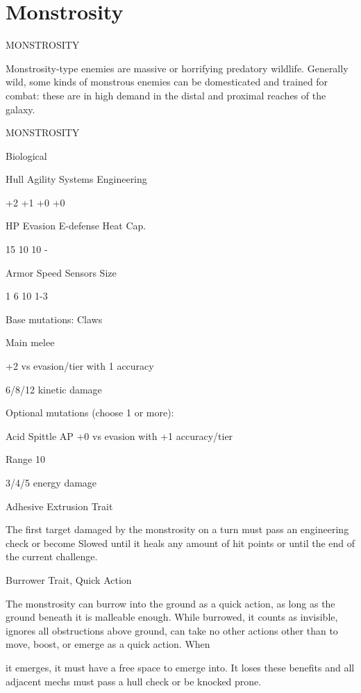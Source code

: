 \section{Monstrosity}
                                           MONSTROSITY

Monstrosity-type enemies are massive or horrifying predatory wildlife. Generally wild, some kinds
of monstrous enemies can be domesticated and trained for combat: these are in high demand in
the distal and proximal reaches of the galaxy.


       MONSTROSITY

       Biological

       Hull       Agility      Systems       Engineering

       +2         +1           +0            +0

       HP         Evasion      E-defense     Heat Cap.

       15         10           10            -

       Armor      Speed        Sensors       Size

       1          6            10            1-3

Base mutations:
Claws

Main melee

+2 vs evasion/tier with 1 accuracy

6/8/12 kinetic damage


Optional mutations (choose 1 or more):


Acid Spittle
AP
+0 vs evasion with +1 accuracy/tier

Range 10

3/4/5 energy damage


Adhesive Extrusion
Trait

The first target damaged by the monstrosity on a turn must pass an engineering check or
become Slowed until it heals any amount of hit points or until the end of the current challenge.


Burrower
Trait, Quick Action

The monstrosity can burrow into the ground as a quick action, as long as the ground beneath it
is malleable enough. While burrowed, it counts as invisible, ignores all obstructions above
ground, can take no other actions other than to move, boost, or emerge as a quick action. When




it emerges, it must have a free space to emerge into. It loses these benefits and all adjacent
mechs must pass a hull check or be knocked prone.


